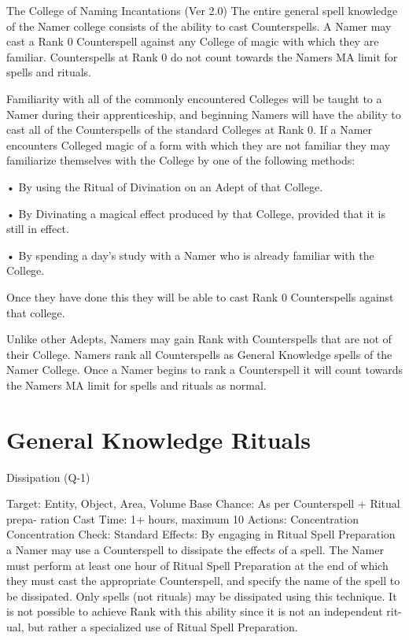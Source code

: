 \begin{Chapter}{The College of Naming Incantations (Ver 2.0)}
The  entire  general  spell  knowledge  of  the  Namer 
college consists of the ability to cast Counterspells. 
A  Namer  may  cast  a  Rank  0  Counterspell  against 
any College of magic with which they are familiar. 
Counterspells  at  Rank  0  do  not  count  towards  the 
Namers MA limit for spells and rituals. 

Familiarity  with  all  of  the  commonly  encountered 
Colleges  will  be  taught  to  a  Namer  during  their 
apprenticeship,  and  beginning  Namers  will  have 
the  ability  to  cast  all  of  the  Counterspells  of  the 
standard Colleges at Rank 0. If a Namer encounters 
Colleged magic of a form with which they are not 
familiar  they  may  familiarize  themselves  with  the 
College by one of the following methods:  

• By using the Ritual of Divination on an Adept of 
that College.  

•  By  Divinating  a  magical  effect  produced  by  that 
College, provided that it is still in effect.  

•  By  spending  a day’s  study  with  a Namer  who  is 
already familiar with the College. 

Once they have done this they  will be able to cast 
Rank 0 Counterspells against that college. 

Unlike other Adepts, Namers may gain Rank with Counterspells that are
not of their College. Namers rank all Counterspells as General
Knowledge spells of the Namer College.  Once a Namer begins to rank a
Counterspell it will count towards the Namers MA limit for spells and
rituals as normal.



\section{General Knowledge Rituals}


Dissipation (Q-1) 


Target: Entity, Object, Area, Volume 
Base Chance: As per Counterspell + Ritual prepa-
ration 
Cast Time: 1+ hours, maximum 10 
Actions: Concentration 
Concentration Check: Standard 
Effects:  By  engaging  in  Ritual  Spell  Preparation  a 
Namer  may  use  a  Counterspell  to  dissipate  the 
effects of a spell. The Namer must perform at least 
one  hour  of  Ritual  Spell  Preparation  at  the  end  of 
which they must cast the appropriate Counterspell, 
and specify the name of the spell to  be dissipated. 
Only  spells  (not  rituals)  may  be  dissipated  using 
this  technique.  It  is  not  possible  to  achieve  Rank 
with  this  ability  since  it  is  not  an  independent  rit-
ual,  but  rather  a  specialized  use  of  Ritual  Spell 
Preparation. 



\end{Chapter}
